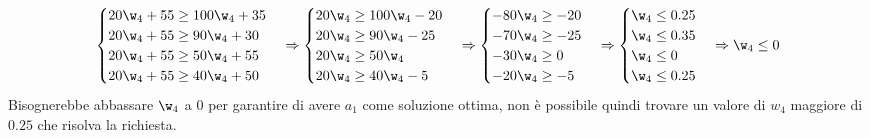 \documentclass[\main/main.tex]{subfiles}
\begin{document}
\[
  \begin{cases}
    20\w_4 + 55 \geq 100\w_4 + 35 \\
    20\w_4 + 55 \geq 90\w_4 + 30  \\
    20\w_4 + 55 \geq 50\w_4 + 55  \\
    20\w_4 + 55 \geq 40\w_4 + 50  \\
  \end{cases}
  \Rightarrow
  \begin{cases}
    20\w_4 \geq 100\w_4 - 20 \\
    20\w_4 \geq 90\w_4 - 25  \\
    20\w_4 \geq 50\w_4       \\
    20\w_4 \geq 40\w_4 - 5   \\
  \end{cases}
  \Rightarrow
  \begin{cases}
    -80\w_4 \geq - 20 \\
    -70\w_4 \geq - 25 \\
    -30\w_4 \geq 0    \\
    -20\w_4 \geq - 5  \\
  \end{cases}
  \Rightarrow
  \begin{cases}
    \w_4 \leq 0.25 \\
    \w_4 \leq 0.35 \\
    \w_4 \leq 0    \\
    \w_4 \leq 0.25 \\
  \end{cases}
  \Rightarrow
  \w_4 \leq 0
\]
Bisognerebbe abbassare $\w_4$ a $0$ per garantire di avere $a_1$ come soluzione ottima, non è possibile quindi trovare un valore di $w_4$ maggiore di $0.25$ che risolva la richiesta.
\end{document}
